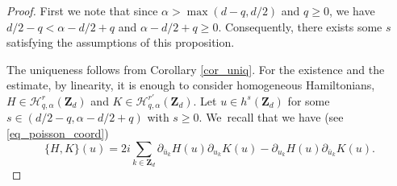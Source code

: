 \documentclass[11pt]{article}
\theoremstyle{definition}
\begin{document}
\begin{proof} First we note that since $\alpha>\max(d-q,d/2)$ and $q\geq 0$, we have $d/2-q < \alpha-d/2+q$ and $\alpha-d/2+q \geq 0$. Consequently, there exists some $s$ satisfying the assumptions of this proposition.

The uniqueness follows from Corollary \ref{cor_uniq}. For the existence and the estimate, by linearity, it is enough to consider homogeneous Hamiltonians, $H\in \mathscr{H}_{q,\alpha}^r(\mathbf{Z}_d)$ and $K\in \mathscr{H}_{q,\alpha}^{r'}(\mathbf{Z}_d)$. Let $u\in h^s(\mathbf{Z}_d)$ for some $s\in (d/2-q, \alpha-d/2+q)$ with $s\geq 0$. We~recall that we have (see \eqref{eq_poisson_coord})
\begin{equation}
\label{eq_un_lapin}
\{ H,K\}(u) =
2i \sum_{k\in \mathbf{Z}_d} \partial_{\bar{u}_k}H(u) \partial_{u_k} K(u) - \partial_{u_k}H(u) \partial_{\bar{u}_k} K(u).
\end{equation}


\end{proof}
\end{document}
